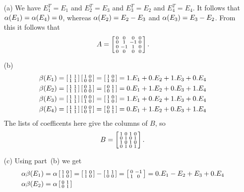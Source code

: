  \begin{itemize}
  \item[(a)] We have $E_1^T=E_1$ and $E_2^T=E_3$ and
   $E_3^T=E_2$ and $E_4^T=E_4$.  It follows that
   $\alpha(E_1)=\alpha(E_4)=0$, whereas $\alpha(E_2)=E_2-E_3$ and
   $\alpha(E_3)=E_3-E_2$.  From this it follows that
   {\tiny \[
     A = \left[\begin{smallmatrix} 0&0&0&0 \\ 0&1&-1&0 \\ 0&-1&1&0\\ 0&0&0&0 \end{smallmatrix}\right].
   \]}
  \item[(b)]
   \begin{align*}
    \beta(E_1) &= \left[\begin{smallmatrix} 1&1\\ 1&1\end{smallmatrix}\right] \left[\begin{smallmatrix} 1&0\\0&0\end{smallmatrix}\right]
              = \left[\begin{smallmatrix} 1&0\\1&0\end{smallmatrix}\right] = 1.E_1+0.E_2+1.E_3 + 0.E_4\\
    \beta(E_2) &= \left[\begin{smallmatrix} 1&1\\ 1&1\end{smallmatrix}\right] \left[\begin{smallmatrix} 0&1\\0&0\end{smallmatrix}\right]
              = \left[\begin{smallmatrix} 0&1\\0&1\end{smallmatrix}\right] = 0.E_1+1.E_2+0.E_3 + 1.E_4\\
    \beta(E_3) &= \left[\begin{smallmatrix} 1&1\\ 1&1\end{smallmatrix}\right] \left[\begin{smallmatrix} 0&0\\1&0\end{smallmatrix}\right]
              = \left[\begin{smallmatrix} 1&0\\1&0\end{smallmatrix}\right] = 1.E_1+0.E_2+1.E_3 + 0.E_4\\
    \beta(E_4) &= \left[\begin{smallmatrix} 1&1\\ 1&1\end{smallmatrix}\right] \left[\begin{smallmatrix} 0&0\\0&1\end{smallmatrix}\right]
              = \left[\begin{smallmatrix} 0&1\\0&1\end{smallmatrix}\right] = 0.E_1+1.E_2+0.E_3 + 1.E_4
   \end{align*}
   The lists of coefficents here give the columns of $B$,
   so
   {\tiny \[
     B = \left[\begin{smallmatrix} 1&0&1&0 \\ 0&1&0&1 \\ 1&0&1&0\\ 0&1&0&1 \end{smallmatrix}\right].
   \]}
  \item[(c)] Using part~(b) we get
   \begin{align*}
    \al\bt(E_1) &=\al\bsm 1&0\\1&0\esm
                 =\bsm 1&0\\1&0\esm -\bsm 1&1\\0&0\esm
                 =\bsm 0&-1\\1&0\esm = 0.E_1-E_2 + E_3 +0.E_4\\
    \al\bt(E_2) &=\al\bsm 0&1\\0&1\esm

\end{align*}
\end{itemize}

